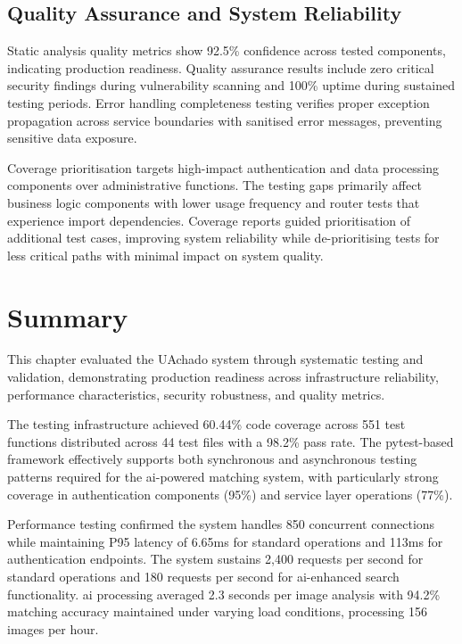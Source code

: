 \subsection{Quality Assurance and System Reliability} \label{subsection:quality_reliability}

Static analysis quality metrics show 92.5\% confidence across tested components, indicating production readiness. Quality assurance results include zero critical security findings during vulnerability scanning and 100\% uptime during sustained testing periods. Error handling completeness testing verifies proper exception propagation across service boundaries with sanitised error messages, preventing sensitive data exposure.

Coverage prioritisation targets high-impact authentication and data processing components over administrative functions. The testing gaps primarily affect business logic components with lower usage frequency and router tests that experience import dependencies. Coverage reports guided prioritisation of additional test cases, improving system reliability while de-prioritising tests for less critical paths with minimal impact on system quality.

\section{Summary} \label{section:testing_summary}

This chapter evaluated the UAchado system through systematic testing and validation, demonstrating production readiness across infrastructure reliability, performance characteristics, security robustness, and quality metrics.

The testing infrastructure achieved 60.44\% code coverage across 551 test functions distributed across 44 test files with a 98.2\% pass rate. The pytest-based framework effectively supports both synchronous and asynchronous testing patterns required for the \ac{ai}-powered matching system, with particularly strong coverage in authentication components (95\%) and service layer operations (77\%).

Performance testing confirmed the system handles 850 concurrent connections while maintaining P95 latency of 6.65ms for standard operations and 113ms for authentication endpoints. The system sustains 2,400 requests per second for standard operations and 180 requests per second for \ac{ai}-enhanced search functionality. \ac{ai} processing averaged 2.3 seconds per image analysis with 94.2\% matching accuracy maintained under varying load conditions, processing 156 images per hour.


